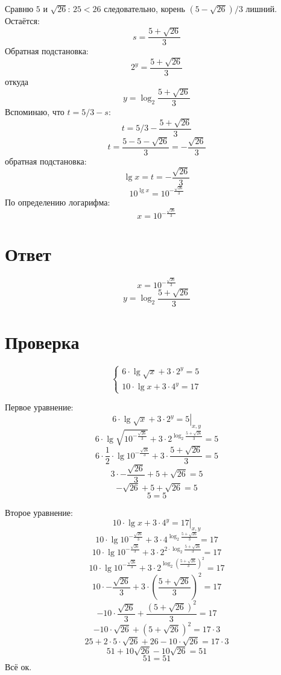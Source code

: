 \documentclass{article}
\begin{document}
Сравню $5$ и $\sqrt{26}$: $25<26$ следовательно, корень $(5-\sqrt{26})/3$ лишний. Остаётся:
$$s=\frac{5+\sqrt{26}}{3}$$
Обратная подстановка:
$$2^y=\frac{5+\sqrt{26}}{3}$$
откуда
$$y=\log_{2}{\frac{5+\sqrt{26}}{3}}$$
Вспоминаю, что $t=5/3-s$:
$$t=5/3-\frac{5+\sqrt{26}}{3}$$
$$t=\frac{5-5-\sqrt{26}}{3}=-\frac{\sqrt{26}}{3}$$
обратная подстановка:
$$\lg{x}=t=-\frac{\sqrt{26}}{3}$$
$$10^{\lg{x}}=10^{ -\frac{\sqrt{26}}{3} }$$
По определению логарифма:
$$x=10^{-\frac{\sqrt{26}}{3} }$$

\section{Ответ}
$$x=10^{-\frac{\sqrt{26}}{3} }$$
$$y=\log_{2}{\frac{5+\sqrt{26}}{3}}$$

\section{Проверка}
\begin{equation*}
    \begin{cases}
    6\cdot\lg{\sqrt{x}}+3\cdot{}2^y=5 \\ 10\cdot\lg{x}+3\cdot{}4^y=17
    \end{cases}
\end{equation*}

Первое уравнение:
$$\left.6\cdot\lg{\sqrt{x}}+3\cdot{}2^y=5\right|_{x,y}$$
$$6\cdot\lg{\sqrt{10^{-\frac{\sqrt{26}}{3} }}}+3\cdot{}2^{ \log_{2}{\frac{5+\sqrt{26}}{3}} }=5$$
$$6\cdot{}\frac{1}{2}\cdot\lg{10^{-\frac{\sqrt{26}}{3} }}+3\cdot{}\frac{5+\sqrt{26}}{3}=5$$
$$3\cdot-\frac{\sqrt{26}}{3}+5+\sqrt{26}=5$$
$$-\sqrt{26}+5+\sqrt{26}=5$$
$$5=5$$

Второе уравнение:
$$\left.10\cdot\lg{x}+3\cdot{}4^y=17\right|_{x,y}$$
$$10\cdot\lg{ 10^{-\frac{\sqrt{26}}{3} } }+3\cdot{}4^{ \log_{2}{\frac{5+\sqrt{26}}{3}} }=17$$
$$10\cdot\lg{ 10^{-\frac{\sqrt{26}}{3} } }+3\cdot{}2^{ 2\cdot\log_{2}{\frac{5+\sqrt{26}}{3}} }=17$$
$$10\cdot\lg{ 10^{-\frac{\sqrt{26}}{3} } }+3\cdot{}2^{ \log_{2}{\left(\frac{5+\sqrt{26}}{3}\right)^2} }=17$$
$$10\cdot-\frac{\sqrt{26}}{3} + 3\cdot{}\left(\frac{5+\sqrt{26}}{3}\right)^2 = 17$$
$$-10\cdot\frac{\sqrt{26}}{3} + \frac{(5+\sqrt{26})^2}{3} = 17$$
$$-10\cdot\sqrt{26} + (5+\sqrt{26})^2 = 17\cdot{3}$$
$$25+2\cdot{}5\cdot{}\sqrt{26}+26-10\cdot\sqrt{26} = 17\cdot{3}$$
$$51+10\sqrt{26}-10\sqrt{26} = 51$$
$$51 = 51$$
Всё ок.
\end{document}

